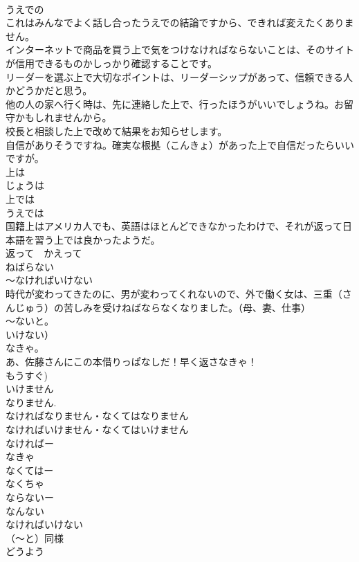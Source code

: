 \documentclass[8pt]{extreport}
\begin{document}
\begin{CJK}{UTF8}{min}
\\	うえでの
\\	これはみんなでよく話し合ったうえでの結論ですから、できれば変えたくありません。
\\	インターネットで商品を買う上で気をつけなければならないことは、そのサイトが信用できるものかしっかり確認することです。
\\	リーダーを選ぶ上で大切なポイントは、リーダーシップがあって、信頼できる人かどうかだと思う。
\\	他の人の家へ行く時は、先に連絡した上で、行ったほうがいいでしょうね。お留守かもしれませんから。
\\	校長と相談した上で改めて結果をお知らせします。
\\	自信がありそうですね。確実な根拠（こんきょ）があった上で自信だったらいいですが。
\\	上は　　
\\	じょうは
\\	上では　　
\\	うえでは
\\	国籍上はアメリカ人でも、英語はほとんどできなかったわけで、それが返って日本語を習う上では良かったようだ。
\\	返って　かえって
\\	ねばらない
\\	～なければいけない
\\	時代が変わってきたのに、男が変わってくれないので、外で働く女は、三重（さんじゅう）の苦しみを受けねばならなくなりました。（母、妻、仕事）
\\	～ないと。
\\	いけない） 
\\	なきゃ。 
\\	あ、佐藤さんにこの本借りっぱなしだ！早く返さなきゃ！
\\	もうすぐ)
\\	いけません
\\	なりません.
\\	なければなりません・なくてはなりません
\\	なければいけません・なくてはいけません
\\	なければー
\\	なきゃ
\\	なくてはー
\\	なくちゃ
\\	ならないー
\\	なんない
\\	なければいけない 
\\	（～と）同様
\\	どうよう

\end{CJK}
\end{document}
